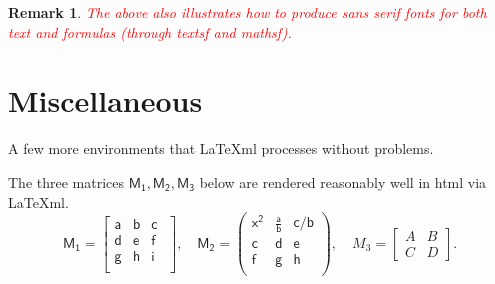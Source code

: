 \documentclass[12pt]{article}
\numberwithin{equation}{section}
\newtheorem{remark}[theorem]{Remark}
\begin{document}
\begin{remark}
\textcolor{red}{The above also illustrates how to produce sans serif fonts for both text and formulas (through textsf and mathsf).}
\end{remark}

\section{Miscellaneous}
A few more environments that LaTeXml processes without problems.

The three matrices $\mathsf{M_1, M_2, M_3}$  below are rendered reasonably well in html via LaTeXml.
\[\mathsf{
M_1=
\begin{bmatrix} 
\textsf{a} & \textsf{b} & \textsf{c }\\
d& e & f\\
g & h& i \\
\end{bmatrix},\quad
M_2=
\begin{pmatrix} 
\mathsf{x^2} & \mathsf{\frac{a}{b}} & \textsf{c/b} \\
c & d & e\\
f & g & h \\
\end{pmatrix}},\quad
M_3=
\left[
\begin{array}{c|c}
A & B \\
\hline
C & D
\end{array}
\right].
\]
\end{document}

